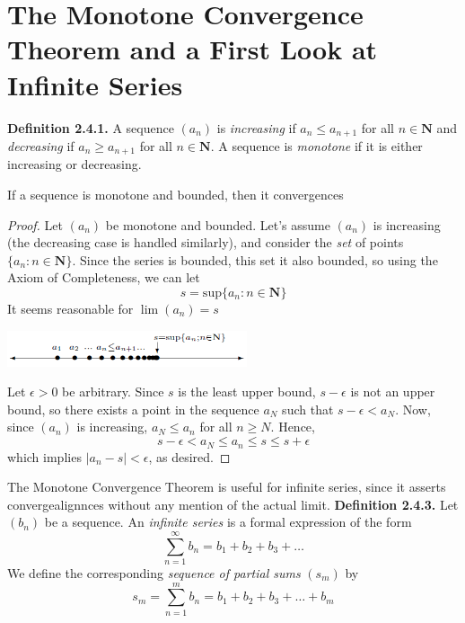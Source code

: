 \section{The Monotone Convergence Theorem and a First Look at Infinite Series}
    \textbf{Definition 2.4.1.} A sequence $(a_n)$ is \textit{increasing} if $a_n \leq a_{n+1}$ for all $n \in \textbf{N}$ and \textit{decreasing} if $a_n \geq a_{n+1}$ for all $n \in \textbf{N}$. A sequence is \textit{monotone} if it is either increasing or decreasing.
    \setcounter{theorem}{1}
    \begin{theorem}
        If a sequence is monotone and bounded, then it convergences
    \end{theorem}
    \begin{proof}
        Let $(a_n)$ be monotone and bounded. Let's assume $(a_n)$ is increasing (the decreasing case is handled similarly), and consider the \textit{set} of points $\{a_n: n \in \textbf{N}\}$. Since the series is bounded, this set it also bounded, so using the Axiom of Completeness, we can let
        $$s = \text{sup}\{a_n: n\in\textbf{N}\}$$
        It seems reasonable for $\lim(a_n) = s$
        \begin{center}
            \includegraphics[width=200pt]{sup.png}
        \end{center}
        Let $\epsilon > 0$ be arbitrary. Since $s$ is the least upper bound, $s - \epsilon$ is not an upper bound, so there exists a point in the sequence $a_N$ such that $s - \epsilon < a_N$. Now, since $(a_n)$ is increasing, $a_N \leq a_n$ for all $n \geq N$. Hence,
        $$s - \epsilon < a_N \leq a_n \leq s \leq s + \epsilon$$
        which implies $|a_n - s| < \epsilon$, as desired.
    \end{proof}
    The Monotone Convergence Theorem is useful for infinite series, since it asserts convergealignnces without any mention of the actual limit.
    \textbf{Definition 2.4.3.} Let $(b_n)$ be a sequence. An \textit{infinite series} is a formal expression of the form
    \begin{equation*}
        \sum_{n=1}^\infty b_n = b_1 + b_2 + b_3 + \dots
    \end{equation*}
    We define the corresponding \textit{sequence of partial sums} $(s_m)$ by 
    \begin{equation*}
        s_m = \sum_{n=1}^m b_n = b_1 + b_2 + b_3 + \dots + b_m
    \end{equation*}
